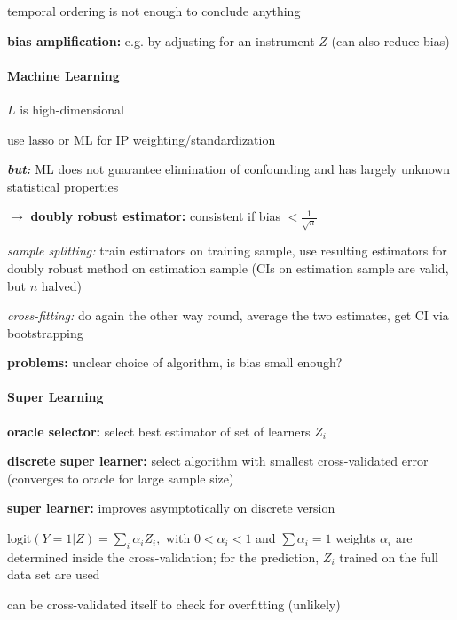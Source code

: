 \documentclass[8pt]{extarticle}
\begin{document}
\begin{multicols}{2}
\noindent temporal ordering is not enough to conclude anything

\noindent \textbf{bias amplification:} e.g. by adjusting for an instrument $Z$ (can also reduce bias)





\paragraph{\large Machine Learning} $L$ is high-dimensional

\noindent use lasso or ML for IP weighting/standardization

\noindent \textbf{\textit{but:}} ML does not guarantee elimination of confounding and has largely unknown statistical properties

\noindent $\rightarrow$ \textbf{doubly robust estimator:} consistent if bias  $< \frac{1}{\sqrt{n}}$

\noindent \textit{sample splitting:} train estimators on training sample, use resulting estimators for doubly robust method on estimation sample (CIs on estimation sample are valid, but $n$ halved)

\noindent \textit{cross-fitting:} do again the other way round, average the two estimates, get CI via bootstrapping

\noindent \textbf{problems:} unclear choice of algorithm, is bias small enough?



\paragraph{\large Super Learning} \citep{van2007super, van2011targeted}

\noindent \textbf{oracle selector:} select best estimator of set of learners $Z_i$

\noindent \textbf{discrete super learner:} select algorithm with smallest cross-validated error (converges to oracle for large sample size)

\noindent \textbf{super learner:} improves asymptotically on discrete version

$\mathrm{logit} (Y=1|Z) = \sum_i \alpha_i Z_i, $ with $0<\alpha_i<1$ and $\sum\alpha_i=1$
weights $\alpha_i$ are determined inside the cross-validation; for the prediction, $Z_i$ trained on the full data set are used

\noindent   can be cross-validated itself to check for overfitting (unlikely)












\end{multicols}
\end{document}
